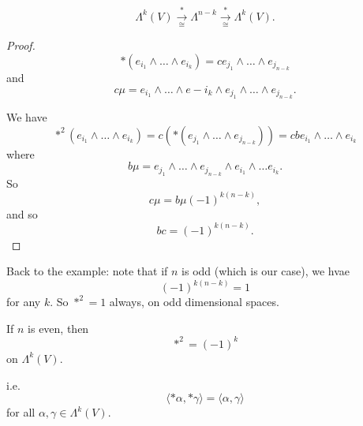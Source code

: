\documentclass[notoc,notitlepage]{tufte-book}
\begin{document}
\begin{equation*}
  \Lambda^k(V) \overset{*}{\underset{\cong}{\to}} \Lambda^{n-k}
  \overset{*}{\underset{\cong}{\to}} \Lambda^k(V).
\end{equation*}

\noindent
{} 

\begin{proof}
  \begin{equation*}
    *(e_{i_1} \land \hdots \land e_{i_k}) = c e_{j_1} \land \hdots \land
    e_{j_{n-k}}
  \end{equation*}
  and
  \begin{equation*}
    c \mu = e_{i_1} \land \hdots \land e-{i_k} \land e_{j_1} \land \hdots \land
    e_{j_{n-k}}.
  \end{equation*}

  We have
  \begin{equation*}
    *^2 (e_{i_1} \land \hdots \land e_{i_k}) = c ( * (e_{j_1} \land \hdots \land
    e_{j_{n-k}}) ) = cb e_{i_1} \land \hdots \land e_{i_k}
  \end{equation*}
  where
  \begin{equation*}
    b \mu = e_{j_1} \land \hdots \land e_{j_{n-k}} \land e_{i_1} \land \hdots
    e_{i_k}.
  \end{equation*}
  So
  \begin{equation*}
    c \mu = b \mu (-1)^{k(n-k)},
  \end{equation*}
  and so
  \begin{equation*}
    bc = (-1)^{k(n-k)}.
  \end{equation*}
\end{proof}

\begin{eg}
  Back to the example: note that if $n$ is odd (which is our case), we hvae
  \begin{equation*}
    (-1)^{k (n-k)} = 1
  \end{equation*}
  for any $k$. So $*^2 = 1$ always, on odd dimensional spaces.

  If $n$ is even, then
  \begin{equation*}
    *^2 = (-1)^k
  \end{equation*}
  on $\Lambda^k(V)$.
\end{eg}

\noindent
{} i.e.
\begin{equation*}
  \langle *\alpha, * \gamma \rangle = \langle \alpha, \gamma \rangle
\end{equation*}
for all $\alpha, \gamma \in \Lambda^k(V)$.
\end{document}
